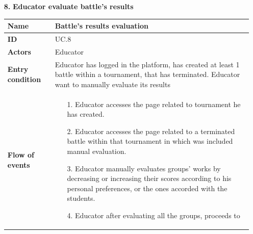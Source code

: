 \documentclass{article}
\begin{document}
{\begin{enumerate}
                    \item[\textbf{8.}] \textbf{Educator evaluate battle's results}
                    \begin{xltabular}{\textwidth}
                        {| >{\raggedright\arraybackslash}g | >{\raggedright\arraybackslash}X |}      
                        \hline
                        \endfirsthead
                        \hline
                        \endhead
                        \endfoot
                        \hline
                        \endlastfoot
                        

                        
                        
                        \textbf{Name} & Battle's results evaluation\\
                        \hline
                        \textbf{ID} & UC.8\\
                        \hline
                        \textbf{Actors} & Educator\\
                        \hline
                        \textbf{Entry condition} & Educator has logged in the platform, has created at least 1 battle
                        within a tournament, that has terminated. Educator want to manually evaluate its results\\
                        \hline
                        \textbf{Flow of events} &    \begin{enumerate}
                                                        \item[1.] Educator accesses the page related to tournament
                                                        he has created.
                                                        \item[2.] Educator accesses the page related to a terminated 
                                                        battle within that tournament in which was included manual 
                                                        evaluation.
                                                        \item[3.] Educator manually evaluates groups' works by decreasing or
                                                        increasing their scores according to his personal preferences, or 
                                                        the ones accorded with the students.
                                                        \item[4.] Educator after evaluating all the groups, proceeds to 

\end{enumerate}
\end{xltabular}
\end{enumerate}}
\end{document}

